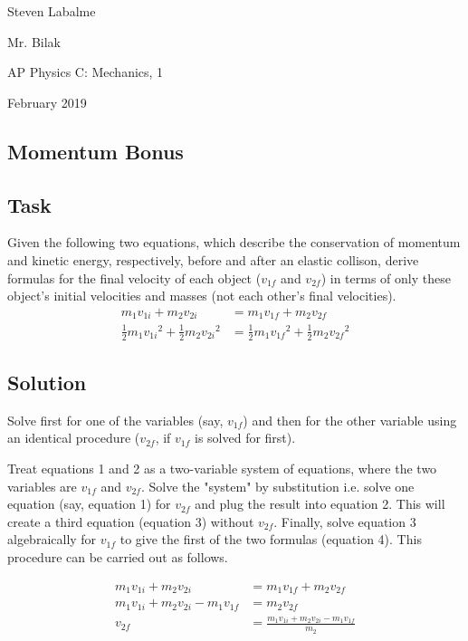 \documentclass{article}
\begin{document}
\pagestyle{fancy}
\fancyhf{}
\renewcommand{\headrulewidth}{0pt}

\noindent Steven Labalme\par
\noindent Mr. Bilak\par
\noindent AP Physics C: Mechanics, 1\par
{} February 2019\par

\begin{center}
\section{Momentum Bonus}
\end{center}

\subsection{Task}
Given the following two equations, which describe the conservation of momentum and kinetic energy, respectively, before and after an elastic collison, derive formulas for the final velocity of each object ($v_{1f}$ and $v_{2f}$) in terms of only these object's initial velocities and masses (not each other's final velocities).
\begin{align}
    m_1v_{1i}+m_2v_{2i} &= m_1v_{1f}+m_2v_{2f}\\
    \frac{1}{2}m_1{v_{1i}}^2+\frac{1}{2}m_2{v_{2i}}^2 &= \frac{1}{2}m_1{v_{1f}}^2+\frac{1}{2}m_2{v_{2f}}^2
\end{align}

\subsection{Solution}
Solve first for one of the variables (say, $v_{1f}$) and then for the other variable using an identical procedure ($v_{2f}$, if $v_{1f}$ is solved for first).\par
Treat equations 1 and 2 as a two-variable system of equations, where the two variables are $v_{1f}$ and $v_{2f}$. Solve the "system" by substitution i.e. solve one equation (say, equation 1) for $v_{2f}$ and plug the result into equation 2. This will create a third equation (equation 3) without $v_{2f}$. Finally, solve equation 3 algebraically for $v_{1f}$ to give the first of the two formulas (equation 4). This procedure can be carried out as follows.

\begin{align*}
    m_1v_{1i}+m_2v_{2i} &= m_1v_{1f}+m_2v_{2f}\\
    m_1v_{1i}+m_2v_{2i}-m_1v_{1f} &= m_2v_{2f}\\
    v_{2f} &= \frac{m_1v_{1i}+m_2v_{2i}-m_1v_{1f}}{m_2}
\end{align*}
\end{document}
